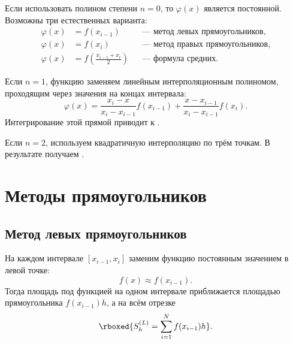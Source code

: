 \documentclass[../final.tex]{subfiles}
\begin{document}
Если использовать полином степени $n=0$, то $\varphi(x)$ является
постоянной. Возможны три естественных варианта:
%
\begin{align*}
    \varphi(x)&=f(x_{i-1})
    &&\text{--- метод левых прямоугольников},\\[2pt]
    \varphi(x)&=f(x_i)
    &&\text{--- метод правых прямоугольников},\\[2pt]
    \varphi(x)&=f\!\left(\frac{x_{i-1}+x_i}{2}\right)
    &&\text{--- формула средних}.
\end{align*}

Если $n=1$, функцию заменяем линейным интерполяционным полиномом,
проходящим через значения на концах интервала:
%
\begin{equation*}
    \varphi(x)
    =
    \frac{x_i-x}{x_i-x_{i-1}}f(x_{i-1})
    +
    \frac{x-x_{i-1}}{x_i-x_{i-1}}f(x_i).
\end{equation*}
%
Интегрирование этой прямой приводит к .

Если $n=2$, используем квадратичную интерполяцию по трём точкам.
В результате получаем .


\section{Методы прямоугольников}

\subsection{Метод левых прямоугольников}

На каждом интервале $[x_{i-1},x_i]$ заменим функцию постоянным
значением в левой точке:
%
\begin{equation*}
    f(x)\approx f(x_{i-1}).
\end{equation*}
%
Тогда площадь под функцией на одном интервале приближается площадью
прямоугольника $f(x_{i-1})h$, а на всём отрезке
%
\begin{equation*}
    \rboxed{
    S_h^{(L)}
    =
    \sum_{i=1}^{N} f(x_{i-1})h
    }.
\end{equation*}
\end{document}
